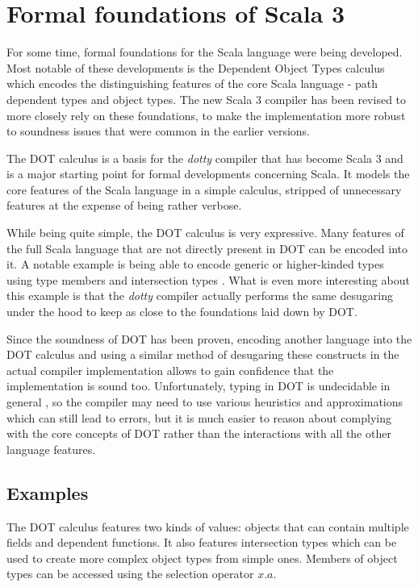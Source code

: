 \section{Formal foundations of Scala 3}

For some time, formal foundations for the Scala language were being developed. Most notable of these developments is the Dependent Object Types calculus \cite{EssenceDOT} which encodes the distinguishing features of the core Scala language - path dependent types and object types. The new Scala 3 compiler has been revised to more closely rely on these foundations, to make the implementation more robust to soundness issues that were common in the earlier versions. 

The DOT calculus is a basis for the \textit{dotty} compiler that has become Scala 3 and is a major starting point for formal developments concerning Scala. It models the core features of the Scala language in a simple calculus, stripped of unnecessary features at the expense of being rather verbose.

While being quite simple, the DOT calculus is very expressive. Many features of the full Scala language that are not directly present in DOT can be encoded into it. A notable example is being able to encode generic or higher-kinded types using type members and intersection types \cite{HKTDOT}. What is even more interesting about this example is that the \textit{dotty} compiler actually performs the same desugaring under the hood to keep as close to the foundations laid down by DOT.

Since the soundness of DOT has been proven, encoding another language into the DOT calculus and using a similar method of desugaring these constructs in the actual compiler implementation allows to gain confidence that the implementation is sound too. Unfortunately, typing in DOT is undecidable in general \cite{undecidableDOT}, so the compiler may need to use various heuristics and approximations which can still lead to errors, but it is much easier to reason about complying with the core concepts of DOT rather than the interactions with all the other language features.

\subsection{Examples}

The DOT calculus features two kinds of values: objects that can contain multiple fields and dependent functions. It also features intersection types which can be used to create more complex object types from simple ones. Members of object types can be accessed using the selection operator $x.a$.

